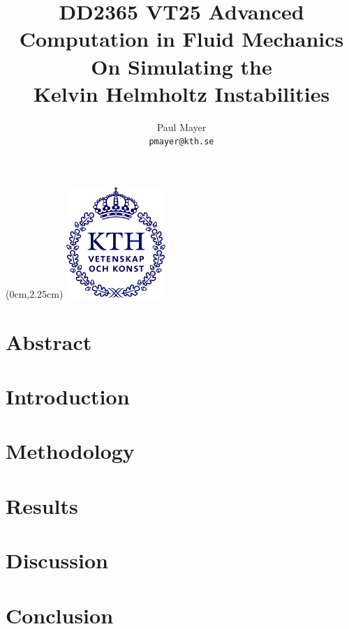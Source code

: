 \documentclass[a4paper,10pt]{article}
\title{
  \vspace{6cm}
  \normalsize{DD2365 VT25 Advanced}\\
  \normalsize{Computation in Fluid Mechanics}\\
  \Large{On Simulating the}\\
  \Large{Kelvin Helmholtz Instabilities}
}
\author{
  \small Paul Mayer\\[-0.75ex]
  \scriptsize\texttt{pmayer@kth.se}
}
\date{}
\begin{document}
\begin{textblock*}{\paperwidth}(0cm,2.25cm)
    \centering 
    \includegraphics[width=3.75cm]{assets/kthlogo.png}
\end{textblock*}

\maketitle
%

\section*{Abstract}
\newpage

\listoftodos
\newpage

\tableofcontents
\newpage

\section{Introduction}

\section{Methodology}

\section{Results}

\section{Discussion}

\section{Conclusion}


\printbibliography
\end{document}
